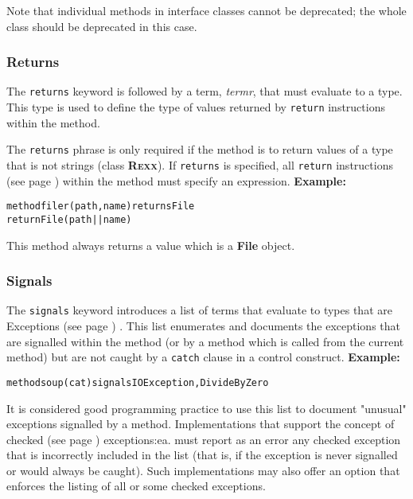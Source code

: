 Note that individual methods in interface classes cannot be
deprecated; the whole class should be deprecated in this case.
\subsubsection{Returns}
 
The \texttt{returns} keyword is followed by a term, \emph{termr},
that must evaluate to a type.
This type is used to define the type of values returned by
\texttt{return} instructions within the method.
 
The \texttt{returns} phrase is only required if the method is to return
values of a type that is not \nr{} strings (class \textbf{R\textsc{exx}}).
If \texttt{returns} is specified, all
 \texttt{return} instructions (see page \pageref{refreturn})  within the method must
specify an expression.
 \textbf{Example:}
\begin{alltt}
method filer(path, name) returns File
  return File(path||name)
\end{alltt}
This method always returns a value which is a \textbf{File} object.
\subsubsection{Signals}
 
The \texttt{signals} keyword introduces a list of terms that evaluate to
types that are  Exceptions (see page \pageref{refexcep}) .
This list enumerates and documents the exceptions that are signalled
within the method (or by a method which is called from the current
method) but are not caught by a \texttt{catch} clause in a control
construct.
 \textbf{Example:}
\begin{alltt}
method soup(cat) signals IOException, DivideByZero
\end{alltt}
 
It is considered good programming practice to use this list to document
"unusual" exceptions signalled by a method.
Implementations that support the concept of  checked (see page \pageref{refchecked}) 
exceptions:ea. must report as an error any checked exception that is
incorrectly included in the list (that is, if the exception is never
signalled or would always be caught).  Such implementations may also
offer an option that enforces the listing of all or some checked
exceptions.
